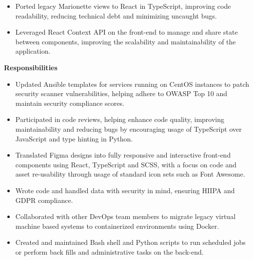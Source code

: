 \documentclass[11pt,a4paper,sans]{moderncv}        %
\begin{document}
{\begin{itemize}
            \item Ported legacy Marionette views to React in TypeScript, improving code readability, reducing technical debt and minimizing uncaught bugs.
            \item Leveraged React Context API on the front-end to manage and share state between components, improving the scalability and maintainability of the application.
        \end{itemize}
        \textbf{Responsibilities}
        \begin{itemize}
                \item Updated Ansible templates for services running on CentOS instances to patch security scanner vulnerabilities, helping adhere to OWASP Top 10 and maintain security compliance scores.
                \item Participated in code reviews, helping enhance code quality, improving maintainability and reducing bugs by encouraging usage of TypeScript over JavaScript and type hinting in Python.
                \item Translated Figma designs into fully responsive and interactive front-end components using React, TypeScript and SCSS, with a focus on code and asset re-usability through usage of standard icon sets such as Font Awesome.
                \item Wrote code and handled data with security in mind, ensuring HIIPA and GDPR compliance.
                \item Collaborated with other DevOps team members to migrate legacy virtual machine based systems to containerized environments using Docker.
                \item Created and maintained Bash shell and Python scripts to run scheduled jobs or perform back fills and administrative tasks on the back-end.
        \end{itemize}
    }
\end{document}
